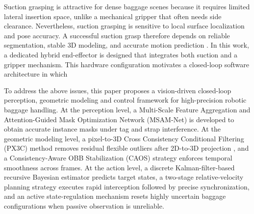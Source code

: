 Suction grasping is attractive for dense baggage scenes because it requires limited lateral insertion space, unlike a mechanical gripper that often needs side clearance. Nevertheless, suction grasping is sensitive to local surface localization and pose accuracy. A successful suction grasp therefore depends on reliable segmentation, stable 3D modeling, and accurate motion prediction \cite{bohg2013data}. In this work, a dedicated hybrid end-effector is designed that integrates both suction and a gripper mechanism.  This hardware configuration motivates a closed-loop software architecture in which 

To address the above issues, this paper proposes a vision-driven closed-loop perception, geometric modeling and control framework for high-precision robotic baggage handling. At the perception level, a Multi-Scale Feature Aggregation and Attention-Guided Mask Optimization Network (MSAM-Net) is developed  to obtain accurate instance masks under tag and strap interference. At the geometric modeling level, a pixel-to-3D Cross Consistency Conditional Filtering (PX3C) method removes residual flexible outliers after 2D-to-3D projection , and a Consistency-Aware OBB Stabilization (CAOS) strategy enforces temporal smoothness across frames. At the action level, a discrete Kalman-filter-based recursive Bayesian estimator predicts target states, a two-stage relative-velocity planning strategy executes rapid interception followed by precise synchronization, and an active state-regulation mechanism resets highly uncertain baggage configurations when passive observation is unreliable.

